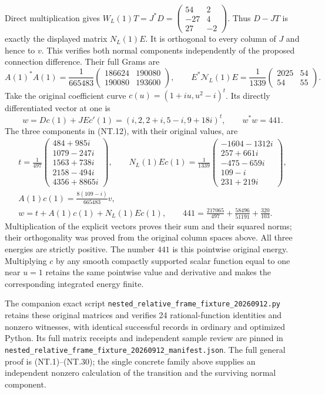 Direct multiplication gives
$W_L(1)T=J^*D=\left(\begin{smallmatrix}54&2\\-27&4\\27&-2\end{smallmatrix}\right)$.
Thus $D-JT$ is exactly the displayed matrix $N_L(1)E$.
It is orthogonal to every column of $J$ and hence to $v$.
This verifies both normal components independently of the proposed
connection difference. Their full Grams are
\[
 A(1)^*A(1)=\frac1{665483}
 \begin{pmatrix}186624&190080\\190080&193600\end{pmatrix},\qquad
 E^*\mathcal N_L(1)E=\frac1{1339}
 \begin{pmatrix}2025&54\\54&55\end{pmatrix}.
 \tag{NT.35}
\]
Take the original coefficient curve $c(u)=(1+iu,u^2-i)^t$.
Its directly differentiated vector at one is
\[
 w=Dc(1)+JEc'(1)=(i,2,2+i,5-i,9+18i)^t,\qquad w^*w=441.
 \tag{NT.36}
\]
The three components in (NT.12), with their original values, are
\[
 \begin{gathered}
 t=\frac1{497}\begin{pmatrix}484+985i\\1079-247i\\1563+738i\\2158-494i\\4356+8865i\end{pmatrix},\qquad
 N_L(1)Ec(1)=\frac1{1339}\begin{pmatrix}-1604-1312i\\257+661i\\-475-659i\\109-i\\231+219i\end{pmatrix},\\
 A(1)c(1)=\frac{8(109-i)}{665483}v,\\
 w=t+A(1)c(1)+N_L(1)Ec(1),\qquad
 \boxed{441=\frac{217065}{497}+\frac{58496}{51191}+\frac{320}{103}.}
 \end{gathered}
 \tag{NT.37}
\]
Multiplication of the explicit vectors proves their sum and their
squared norms; their orthogonality was proved from the original
column spaces above. All three energies are strictly positive.
The number $441$ is this pointwise original energy. Multiplying
$c$ by any smooth compactly supported scalar function equal to one
near $u=1$ retains the same pointwise value and derivative and
makes the corresponding integrated energy finite.

The companion exact script
\nolinkurl{nested_relative_frame_fixture_20260912.py} retains
these original matrices and verifies 24 rational-function identities
and nonzero witnesses, with identical successful records in ordinary
and optimized Python. Its full matrix receipts and independent
sample review are pinned in
\nolinkurl{nested_relative_frame_fixture_20260912_manifest.json}.
The full general proof is (NT.1)--(NT.30); the single concrete
family above supplies an independent nonzero calculation of the
transition and the surviving normal component.
